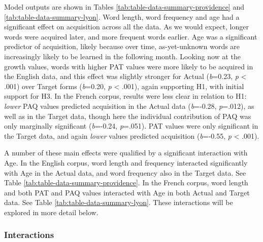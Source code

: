 \documentclass[
  english,
  man,floatsintext]{apa6}
\begin{document}
Model outputs are shown in Tables \ref{tab:table-data-summary-providence} and \ref{tab:table-data-summary-lyon}. Word length, word frequency and age had a significant effect on acquisition across all the data. As we would expect, longer words were acquired later, and more frequent words earlier. Age was a significant predictor of acquisition, likely because over time, as-yet-unknown words are increasingly likely to be learned in the following month. Looking now at the growth values, words with higher PAT values were more likely to be acquired in the English data, and this effect was slightly stronger for Actual (\emph{b}=0.23, \emph{p} \textless{} .001) over Target forms (\emph{b}=0.20, \emph{p} \textless{} .001), again supporting H1, with initial support for H3. In the French corpus, results were less clear in relation to H1: \emph{lower} PAQ values predicted acquisition in the Actual data (\emph{b}=-0.28, \emph{p}=.012), as well as in the Target data, though here the individual contribution of PAQ was only marginally significant (\emph{b}=-0.24, \emph{p}=.051). PAT values were only significant in the Target data, and again \emph{lower} values predicted acquisition (\emph{b}=-0.55, \emph{p} \textless{} .001).

A number of these main effects were qualified by a significant interaction with Age. In the English corpus, word length and frequency interacted significantly with Age in the Actual data, and word frequency also in the Target data. See Table \ref{tab:table-data-summary-providence}. In the French corpus, word length and both PAT and PAQ values interacted with Age in both Actual and Target data. See Table \ref{tab:table-data-summary-lyon}. These interactions will be explored in more detail below.

\hypertarget{interactions}{%
\subsubsection{Interactions}\label{interactions}}
\end{document}

